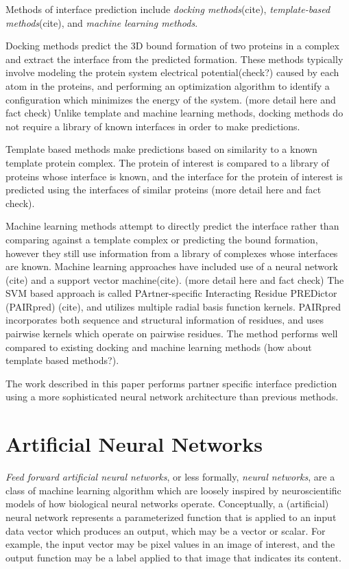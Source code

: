 Methods of interface prediction include \textit{docking methods}(cite), \textit{template-based methods}(cite), and \textit{machine learning methods}.

Docking methods predict the 3D bound formation of two proteins in a complex and extract the interface from the predicted formation. 
These methods typically involve modeling the protein system electrical potential(check?) caused by each atom in the proteins, and performing an optimization algorithm to identify a configuration which minimizes the energy of the system. (more detail here and fact check)
Unlike template and machine learning methods, docking methods do not require a library of known interfaces in order to make predictions.

Template based methods make predictions based on similarity to a known template protein complex. 
The protein of interest is compared to a library of proteins whose interface is known, and the interface for the protein of interest is predicted using the interfaces of similar proteins (more detail here and fact check).

Machine learning methods attempt to directly predict the interface rather than comparing against a template complex or predicting the bound formation, however they still use information from a library of complexes whose interfaces are known.
Machine learning approaches have included use of a neural network (cite) and a support vector machine(cite). (more detail here and fact check)
The SVM based approach is called PArtner-specific Interacting Residue PREDictor (PAIRpred) (cite), and utilizes multiple radial basis function kernels. 
PAIRpred incorporates both sequence and structural information of residues, and uses pairwise kernels which operate on pairwise residues.
The method performs well compared to existing docking and machine learning methods (how about template based methods?).



The work described in this paper performs partner specific interface prediction using a more sophisticated neural network architecture than previous methods. 


\section{Artificial Neural Networks}

\textit{Feed forward artificial neural networks}, or less formally, \textit{neural networks}, are a class of machine learning algorithm which are loosely inspired by neuroscientific models of how biological neural networks operate. 
Conceptually, a (artificial) neural network represents a parameterized function that is applied to an input data vector which produces an output, which may be a vector or scalar. 
For example, the input vector may be pixel values in an image of interest, and the output function may be a label applied to that image that indicates its content.

